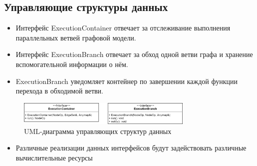 \subsection{Управляющие структуры данных}
\begin{frame}
    \begin{itemize}
        \item Интерфейс ExecutionContainer отвечает за отслеживание выполнения параллельных ветвей графовой модели.
        \item Интерфейс ExecutionBranch отвечает за обход одной ветви графа и хранение вспомогательной информации о нём.
        \item ExecutionBranch уведомляет контейнер по завершении каждой функции перехода в обходимой ветви.
    \end{itemize}

    \begin{figure}
        \centering
        \includegraphics[width=0.75\textwidth]{images/UML.all.png}
        \caption{UML-диаграмма управляющих структур данных}
    \end{figure}

    \begin{itemize}
        \item Различные реализации данных интерфейсов будут задействовать различные вычислительные ресурсы
    \end{itemize}


\end{frame}
